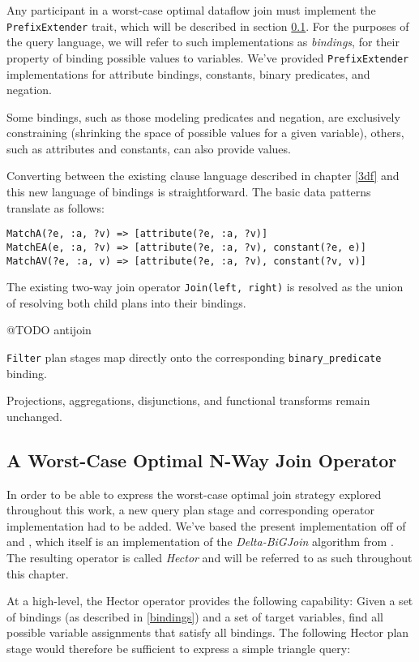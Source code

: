 \documentclass[../index.tex]{subfiles}
\begin{document}
Any participant in a worst-case optimal dataflow join must implement
the \texttt{PrefixExtender} trait, which will be described in section
\ref{impl-hector}. For the purposes of the query language, we will
refer to such implementations as \emph{bindings}, for their property
of binding possible values to variables. We've provided
\texttt{PrefixExtender} implementations for attribute bindings,
constants, binary predicates, and negation.

Some bindings, such as those modeling predicates and negation, are
exclusively constraining (shrinking the space of possible values for a
given variable), others, such as attributes and constants, can also
provide values.

Converting between the existing clause language described in chapter
\ref{3df} and this new language of bindings is straightforward. The
basic data patterns translate as follows:

\begin{verbatim}
MatchA(?e, :a, ?v) => [attribute(?e, :a, ?v)]
MatchEA(e, :a, ?v) => [attribute(?e, :a, ?v), constant(?e, e)]
MatchAV(?e, :a, v) => [attribute(?e, :a, ?v), constant(?v, v)]
\end{verbatim}

The existing two-way join operator \texttt{Join(left, right)} is
resolved as the union of resolving both child plans into their
bindings.

@TODO antijoin

\texttt{Filter} plan stages map directly onto the corresponding
\texttt{binary\_predicate} binding.

Projections, aggregations, disjunctions, and functional transforms
remain unchanged.

\subsection{A Worst-Case Optimal N-Way Join Operator} \label{impl-hector}

In order to be able to express the worst-case optimal join strategy
explored throughout this work, a new query plan stage and
corresponding operator implementation had to be added. We've based the
present implementation off of \cite{dogsdogsdogs} and
\cite{dataflowjoin}, which itself is an implementation of the
\emph{Delta-BiGJoin} algorithm from \cite{ammar2018distributed}. The
resulting operator is called \emph{Hector} and will be referred to as
such throughout this chapter.

At a high-level, the Hector operator provides the following
capability: Given a set of bindings (as described in \ref{bindings})
and a set of target variables, find all possible variable assignments
that satisfy all bindings. The following Hector plan stage would
therefore be sufficient to express a simple triangle query:
\end{document}
